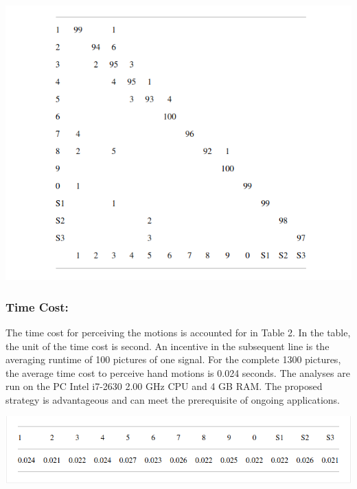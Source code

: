 \documentclass[a4paper]{article}
\begin{document}
\begin{center}
\includegraphics[scale=0.26]{Table1}
\end{center}


\subsubsection{Time Cost:}
The time cost for perceiving the motions is accounted for in Table 2. In the table, the unit of the time cost is second. An incentive in the subsequent line is the averaging runtime of 100 pictures of one signal. For the complete 1300 pictures, the average time cost to perceive hand motions is 0.024 seconds. The analyses are run on the PC Intel i7-2630 2.00 GHz CPU and 4 GB RAM. The proposed strategy is advantageous and can meet the prerequisite of ongoing applications.

\begin{center}
\includegraphics[scale=0.3]{Table2}
\end{center}
\end{document}
